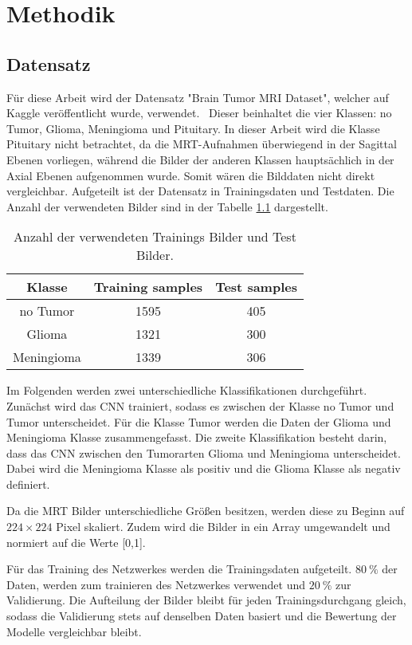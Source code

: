 \chapter{Methodik}
\section{Datensatz}
Für diese Arbeit wird der Datensatz "Brain Tumor MRI Dataset", welcher auf Kaggle veröffentlicht wurde, verwendet.~\cite{msoud_nickparvar_2021}
Dieser beinhaltet die vier Klassen: no Tumor, Glioma, Meningioma und Pituitary.
In dieser Arbeit wird die Klasse Pituitary nicht betrachtet, da die MRT-Aufnahmen überwiegend in der Sagittal Ebenen vorliegen, während die Bilder der anderen Klassen
hauptsächlich in der Axial Ebenen aufgenommen wurde.
Somit wären die Bilddaten nicht direkt vergleichbar.
Aufgeteilt ist der Datensatz in Trainingsdaten und Testdaten.
Die Anzahl der verwendeten Bilder sind in der Tabelle \ref{tab:daten} dargestellt. 
\begin{table}[H]
    \centering
    \begin{tabular}{c c c}
        \toprule
        Klasse      & Training samples & Test samples \\
        \midrule
        no Tumor    &    1595          & 405 \\
        Glioma      &    1321          & 300 \\
        Meningioma  &    1339          & 306 \\
        \bottomrule
  \end{tabular}
  \caption{Anzahl der verwendeten Trainings Bilder und Test Bilder.}
  \label{tab:daten}
\end{table}
\vspace{-2em}
Im Folgenden werden zwei unterschiedliche Klassifikationen durchgeführt.
Zunächst wird das CNN trainiert, sodass es zwischen der Klasse no Tumor und Tumor unterscheidet. Für die Klasse Tumor
werden die Daten der Glioma und Meningioma Klasse zusammengefasst.
Die zweite Klassifikation besteht darin, dass das CNN zwischen den Tumorarten Glioma und Meningioma unterscheidet.
Dabei wird die Meningioma Klasse als positiv und die Glioma Klasse als negativ definiert.

Da die MRT Bilder unterschiedliche Größen besitzen, werden diese zu Beginn auf $224 \times 224$ Pixel skaliert.
Zudem wird die Bilder in ein Array umgewandelt und normiert auf die Werte [0,1].

Für das Training des Netzwerkes werden die Trainingsdaten aufgeteilt. $\qty{80}{\%}$ der Daten, werden zum trainieren des Netzwerkes 
verwendet und $\qty{20}{\%}$ zur Validierung.
Die Aufteilung der Bilder bleibt für jeden Trainingsdurchgang gleich, sodass die Validierung stets auf denselben Daten basiert und die Bewertung der Modelle vergleichbar bleibt.

